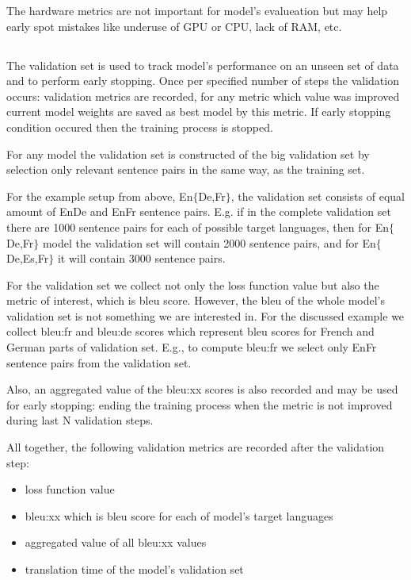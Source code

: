 The hardware metrics are not important for model's evalueation
but may help early spot mistakes like underuse of GPU or CPU, lack of RAM, etc.

\subsection{}
\label{subsection:validation}

The validation set is used to track model's performance
on an unseen set of data and to perform early stopping.
Once per specified number of steps the validation occurs:
validation metrics are recorded, for any metric which value was
improved current model weights are saved as best model by this metric.
If early stopping condition occured then the training process is stopped.

For any model the validation set is constructed of the big validation set
by selection only relevant sentence pairs in the same way, as the training set.

For the example setup from above, En\to{}$\{$De,Fr$\}$, the validation set
consists of equal amount of En\to{}De and En\to{}Fr sentence pairs.
E.g. if in the complete validation set there are 1000 sentence pairs for
each of possible target languages, then for En\to{}$\{$De,Fr$\}$
model the validation set will contain 2000 sentence pairs, and for
En\to{}$\{$De,Es,Fr$\}$ it will contain 3000 sentence pairs.

For the validation set we collect not only the loss function value
but also the metric of interest, which is \acrshort{bleu} score.
However, the \acrshort{bleu} of the whole model's validation set
is not something we are interested in.
For the discussed example we collect bleu:fr and bleu:de scores
which represent \acrshort{bleu} scores for French and German
parts of validation set.
E.g., to compute bleu:fr we select only En\to{}Fr sentence pairs from the
validation set.

Also, an aggregated value of the bleu:xx scores is also recorded
and may be used for early stopping: ending the training process
when the metric is not improved during last N validation steps.

\begin{samepage}
All together, the following validation metrics are recorded after the
validation step:
\begin{itemize}
	\item loss function value
	\item bleu:xx which is \acrshort{bleu} score for each of
	model's target languages
	\item aggregated value of all bleu:xx values
	\item translation time of the model's validation set
\end{itemize}
\end{samepage}

